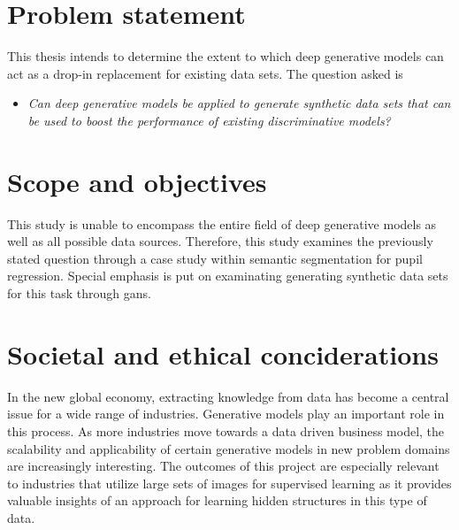 \section{Problem statement}
This thesis intends to determine the extent to which deep generative models can act as a drop-in replacement for existing data sets. The question asked is

\begin{itemize}
    \item \textit{Can deep generative models be applied to generate synthetic data sets that can be used to boost the performance of existing discriminative models?}
\end{itemize}


\section{Scope and objectives}
This study is unable to encompass the entire field of deep generative models as well as all possible data sources. Therefore, this study examines the previously stated question through a case study within semantic segmentation for pupil regression. Special emphasis is put on examinating generating synthetic data sets for this task through \acrlong{gans}.

\section{Societal and ethical conciderations}
In the new global economy, extracting knowledge from data has become a central issue for a wide range of industries. Generative models play an important role in this process. As more industries move towards a data driven business model, the scalability and applicability of certain generative models in new problem domains are increasingly interesting. The outcomes of this project are especially relevant to industries that utilize large sets of images for supervised learning as it provides valuable insights of an approach for learning hidden structures in this type of data.

